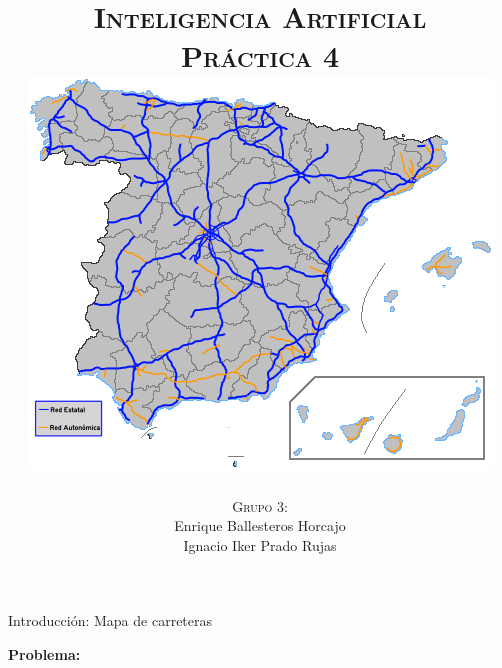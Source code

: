 \documentclass[11pt, a4paper, spanish, openright, twoside]{book}
\begin{document}
 
\title{\Huge{\textsc{Inteligencia Artificial}} \\
	\vspace{0.7cm}
	 \textsc{\Large{Práctica 4}} \\
	\vspace{1.5cm}
	\includegraphics[scale=0.45]{mapaCarreteras}}
\author{\textsc{Grupo 3:}\\
	Enrique Ballesteros Horcajo\\
	Ignacio Iker Prado Rujas}
\date{\Today}
\maketitle

\newpage
\mbox{}
\thispagestyle{empty}						%
\newpage


\tableofcontents 							%

\newpage
\mbox{}
\thispagestyle{empty}						%
\newpage


\vspace{3cm}


\newpage



\begin{section}{Introducción: Mapa de carreteras}

	\textbf{Problema:} \textit{}


\end{section}
\end{document}
